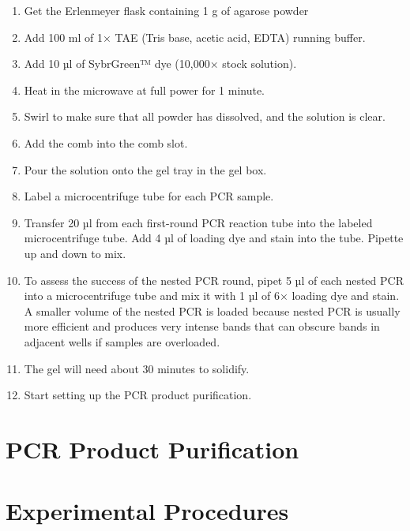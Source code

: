 \documentclass[]{book}
\providecommand{\tightlist}{%
  \setlength{\itemsep}{0pt}\setlength{\parskip}{0pt}}
\begin{document}
\begin{enumerate}
\def\labelenumi{\arabic{enumi}.}
\tightlist
\item
  Get the Erlenmeyer flask containing 1 g of agarose powder
\item
  Add 100 ml of 1× TAE (Tris base, acetic acid, EDTA) running buffer.
\item
  Add 10 µl of SybrGreen™ dye (10,000× stock solution).
\item
  Heat in the microwave at full power for 1 minute.
\item
  Swirl to make sure that all powder has dissolved, and the solution is
  clear.
\item
  Add the comb into the comb slot.
\item
  Pour the solution onto the gel tray in the gel box.
\item
  Label a microcentrifuge tube for each PCR sample.
\item
  Transfer 20 µl from each first-round PCR reaction tube into the
  labeled microcentrifuge tube. Add 4 µl of loading dye and stain into
  the tube. Pipette up and down to mix.
\item
  To assess the success of the nested PCR round, pipet 5 µl of each
  nested PCR into a microcentrifuge tube and mix it with 1 µl of 6×
  loading dye and stain. A smaller volume of the nested PCR is loaded
  because nested PCR is usually more efficient and produces very intense
  bands that can obscure bands in adjacent wells if samples are
  overloaded.
\item
  The gel will need about 30 minutes to solidify.
\item
  Start setting up the PCR product purification.
\end{enumerate}

\section{PCR Product Purification}\label{pcr-product-purification}

\section{Experimental Procedures}\label{experimental-procedures-13}
\end{document}
